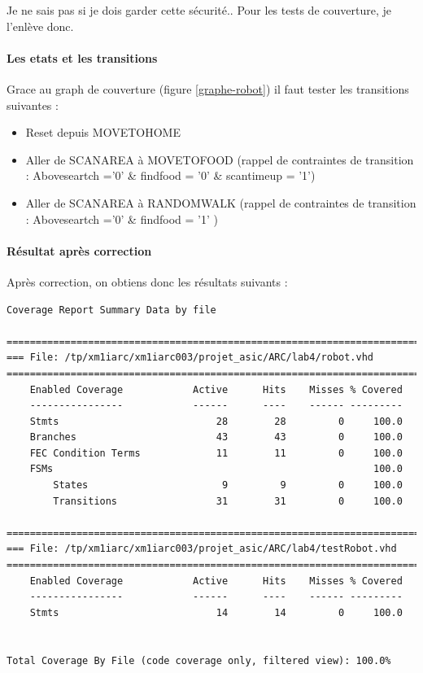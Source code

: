\documentclass{article}
\newcommand{\sautligne}{
\textbf{\vspace{5mm}}
}
\begin{document}
Je ne sais pas si je dois garder cette sécurité.. Pour les tests de couverture, je l'enlève donc.

\sautligne

\paragraph{Les etats et les transitions}
Grace au graph de couverture (figure \ref{graphe-robot}) il faut tester les transitions suivantes :
\begin{itemize}
\item Reset depuis MOVETOHOME
\item Aller de SCANAREA à MOVETOFOOD (rappel de contraintes de transition : Aboveseartch ='0' \& findfood = '0' \& scantimeup = '1')
\item Aller de SCANAREA à RANDOMWALK (rappel de contraintes de transition : Aboveseartch ='0' \& findfood = '1' )
\end{itemize}

\paragraph{Résultat après correction}
Après correction, on obtiens donc les résultats suivants :

\begin{verbatim}
Coverage Report Summary Data by file

=================================================================================
=== File: /tp/xm1iarc/xm1iarc003/projet_asic/ARC/lab4/robot.vhd
=================================================================================
    Enabled Coverage            Active      Hits    Misses % Covered
    ----------------            ------      ----    ------ ---------
    Stmts                           28        28         0     100.0
    Branches                        43        43         0     100.0
    FEC Condition Terms             11        11         0     100.0
    FSMs                                                       100.0
        States                       9         9         0     100.0
        Transitions                 31        31         0     100.0

=================================================================================
=== File: /tp/xm1iarc/xm1iarc003/projet_asic/ARC/lab4/testRobot.vhd
=================================================================================
    Enabled Coverage            Active      Hits    Misses % Covered
    ----------------            ------      ----    ------ ---------
    Stmts                           14        14         0     100.0


Total Coverage By File (code coverage only, filtered view): 100.0%
\end{verbatim}
\end{document}
